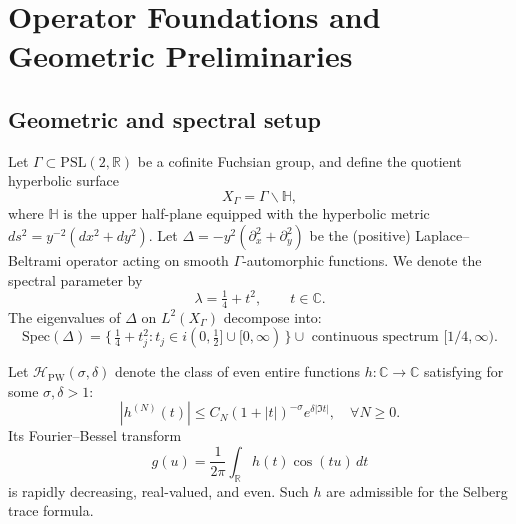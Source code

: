 
\section{Operator Foundations and Geometric Preliminaries}
\label{sec:ch4-part1-operator-foundations} \relax \hspace{0pt}

\subsection{Geometric and spectral setup}
\label{subsec:ch4-part1-geo-setup} \relax

Let $\Gamma\subset\mathrm{PSL}(2,\mathbb{R})$ be a cofinite Fuchsian group, and define the quotient hyperbolic surface
\[
X_\Gamma = \Gamma \backslash \mathbb{H},
\]
where $\mathbb{H}$ is the upper half-plane equipped with the hyperbolic metric $ds^2 = y^{-2}(dx^2+dy^2)$.  
Let $\Delta = -y^2(\partial_x^2 + \partial_y^2)$ be the (positive) Laplace–Beltrami operator acting on smooth $\Gamma$-automorphic functions.  
We denote the spectral parameter by
\[
\lambda = \tfrac{1}{4}+t^2,\qquad t\in\mathbb{C}.
\]
The eigenvalues of $\Delta$ on $L^2(X_\Gamma)$ decompose into:
\[
\mathrm{Spec}(\Delta) = 
\{\,\tfrac{1}{4}+t_j^2 : t_j \in i(0,\tfrac{1}{2}] \cup [0,\infty)\,\}
\cup \text{ continuous spectrum } [1/4,\infty).
\]

\begin{definition}
\label{def:paley-wiener}
Let $\mathcal{H}_{\mathrm{PW}}(\sigma,\delta)$ denote the class of even entire functions $h:\mathbb{C}\to\mathbb{C}$ satisfying for some $\sigma,\delta>1$:
\[
|h^{(N)}(t)| \le C_N (1+|t|)^{-\sigma} e^{\delta |\Im t|},\quad \forall N\ge0.
\]
Its Fourier–Bessel transform
\[
g(u) = \frac{1}{2\pi}\!\int_{\mathbb{R}} h(t) \cos(tu)\,dt
\]
is rapidly decreasing, real-valued, and even.  
Such $h$ are admissible for the Selberg trace formula.
\end{definition}

